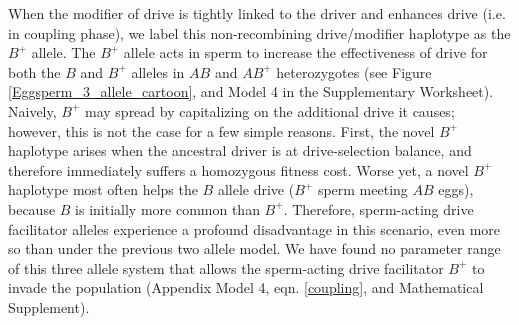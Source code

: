 \documentclass[12pt,letterpaper]{article}
\begin{document}
When the modifier of drive is tightly linked to the driver and
enhances drive (i.e. in coupling phase), 
	we label  this non-recombining drive/modifier haplotype as the $B^+$ allele.  
The $B^+$ allele acts in sperm to increase the effectiveness of drive for both
	the $B$ and  $B^{+}$ alleles in $AB$ and $AB^{+}$ heterozygotes (see Figure \ref{Eggsperm_3_allele_cartoon}, and Model 4 in the Supplementary Worksheet). 
Naively, $B^{+}$ may spread by capitalizing on the additional drive it causes; however,  
	this is not the case for a few simple reasons. 
First, %
	the novel $B^{+}$ haplotype
	arises when the ancestral driver 
	is at drive-selection balance, 
	and therefore immediately suffers a homozygous fitness cost.  
Worse yet, a novel $B^{+}$ haplotype most often helps 
	the $B$  allele drive ($B^+$ sperm meeting $AB$ eggs), because $B$ is initially more common than $B^{+}$. 
Therefore, sperm-acting drive facilitator alleles experience a profound disadvantage 
	in this scenario, even more so than under the previous two allele model. 
We have found no parameter range of this
	three allele system that allows the sperm-acting drive facilitator $B^{+}$ to
	invade the population (Appendix Model 4, eqn. \eqref{coupling}, and Mathematical Supplement). 
\end{document}
